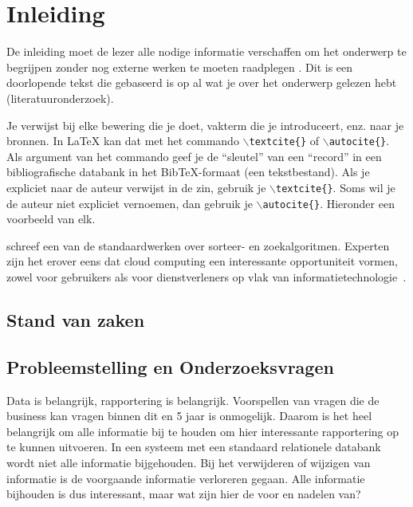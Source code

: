 
\chapter{Inleiding}
\label{ch:inleiding}

De inleiding moet de lezer alle nodige informatie verschaffen om het onderwerp te begrijpen zonder nog externe werken te moeten raadplegen \autocite{Pollefliet2011}. Dit is een doorlopende tekst die gebaseerd is op al wat je over het onderwerp gelezen hebt (literatuuronderzoek).

Je verwijst bij elke bewering die je doet, vakterm die je introduceert, enz. naar je bronnen. In \LaTeX{} kan dat met het commando \texttt{$\backslash${textcite\{\}}} of \texttt{$\backslash${autocite\{\}}}. Als argument van het commando geef je de ``sleutel'' van een ``record'' in een bibliografische databank in het Bib\TeX{}-formaat (een tekstbestand). Als je expliciet naar de auteur verwijst in de zin, gebruik je \texttt{$\backslash${}textcite\{\}}.
Soms wil je de auteur niet expliciet vernoemen, dan gebruik je \texttt{$\backslash${}autocite\{\}}. Hieronder een voorbeeld van elk.

\textcite{Knuth1998} schreef een van de standaardwerken over sorteer- en zoekalgoritmen. Experten zijn het erover eens dat cloud computing een interessante opportuniteit vormen, zowel voor gebruikers als voor dienstverleners op vlak van informatietechnologie~\autocite{Creeger2009}.

\section{Stand van zaken}
\label{sec:stand-van-zaken}


\section{Probleemstelling en Onderzoeksvragen}
\label{sec:onderzoeksvragen}

Data is belangrijk, rapportering is belangrijk. Voorspellen van vragen die de business kan vragen binnen dit en 5 jaar is onmogelijk. Daarom is het heel belangrijk om alle informatie bij te houden om hier interessante rapportering op te kunnen uitvoeren. In een systeem met een standaard relationele databank wordt niet alle informatie bijgehouden. Bij het verwijderen of wijzigen van informatie is de voorgaande informatie verloreren gegaan. Alle informatie bijhouden is dus interessant, maar wat zijn hier de voor en nadelen van?

